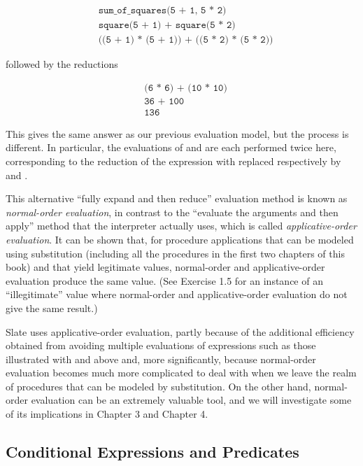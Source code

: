 \begin{align}
&\texttt{sum\_of\_squares(5 + 1, 5 * 2)} \nonumber \\
&\texttt{square(5 + 1) + square(5 * 2)} \nonumber \\
&\texttt{((5 + 1) * (5 + 1)) + ((5 * 2) * (5 * 2))} \nonumber
\end{align}

followed by the reductions

\begin{align}
&\texttt{(6 * 6) + (10 * 10)} \nonumber \\
&\texttt{36 + 100} \nonumber \\
&\texttt{136} \nonumber
\end{align}

This gives the same answer as our previous evaluation model, but the process is different. In particular, the evaluations of  and  are each performed twice here, corresponding to the reduction of the expression  with  replaced respectively by  and .

This alternative ``fully expand and then reduce'' evaluation method is known as \textit{normal-order evaluation}, in contrast to the ``evaluate the arguments and then apply'' method that the interpreter actually uses, which is called \textit{applicative-order evaluation}. It can be shown that, for procedure applications that can be modeled using substitution (including all the procedures in the first two chapters of this book) and that yield legitimate values, normal-order and applicative-order evaluation produce the same value. (See Exercise 1.5 for an instance of an ``illegitimate'' value where normal-order and applicative-order evaluation do not give the same result.)

Slate uses applicative-order evaluation, partly because of the additional efficiency obtained from avoiding multiple evaluations of expressions such as those illustrated with  and  above and, more significantly, because normal-order evaluation becomes much more complicated to deal with when we leave the realm of procedures that can be modeled by substitution. On the other hand, normal-order evaluation can be an extremely valuable tool, and we will investigate some of its implications in Chapter 3 and Chapter 4.

\subsection{Conditional Expressions and Predicates}

